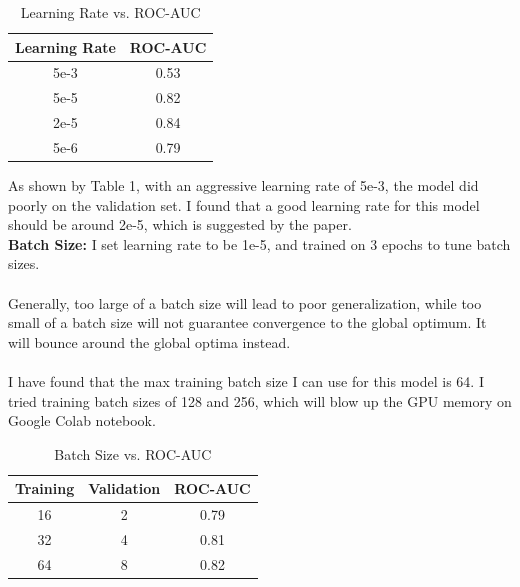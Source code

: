 \documentclass[11pt,a4paper]{article}
\begin{document}
\begin{table}[!htbp]
	\centering
	\begin{tabular}{|c|c|}
		\hline
		{Learning Rate} & {ROC-AUC} \\ \hline
		5e-3                   & 0.53             \\ \hline
		5e-5                   & 0.82             \\ \hline
		2e-5                   & 0.84             \\ \hline
		5e-6                   & 0.79             \\ \hline
	\end{tabular}
	\caption{\label{table:my-label} Learning Rate vs. ROC-AUC}
\end{table}

\noindent As shown by Table 1, with an aggressive learning rate of 5e-3, the model did poorly on the validation set. I found that a good learning rate for this model should be around 2e-5, which is suggested by the paper.\\

\noindent \textbf {Batch Size:} I set learning rate to be 1e-5, and trained on 3 epochs to tune batch sizes.\\
\\
Generally, too large of a batch size will lead to poor generalization, while too small of a batch size will not guarantee convergence to the global optimum. It will bounce around the global optima instead. \\
\\
I have found that the max training batch size I can use for this model is 64. I tried training batch sizes of 128 and 256, which will blow up the GPU memory on Google Colab notebook.\\

\begin{table}[!htbp]
	\centering
	\begin{tabular}{|c|c|c|}
		\hline
		{Training} & {Validation} & {ROC-AUC} \\ \hline
		16                           & 2                              & 0.79             \\ \hline
		32                           & 4                              & 0.81             \\ \hline
		64                           & 8                              & 0.82             \\ \hline
	\end{tabular}
	\caption{\label{table:my-label} Batch Size vs. ROC-AUC}
\end{table}
\end{document}
